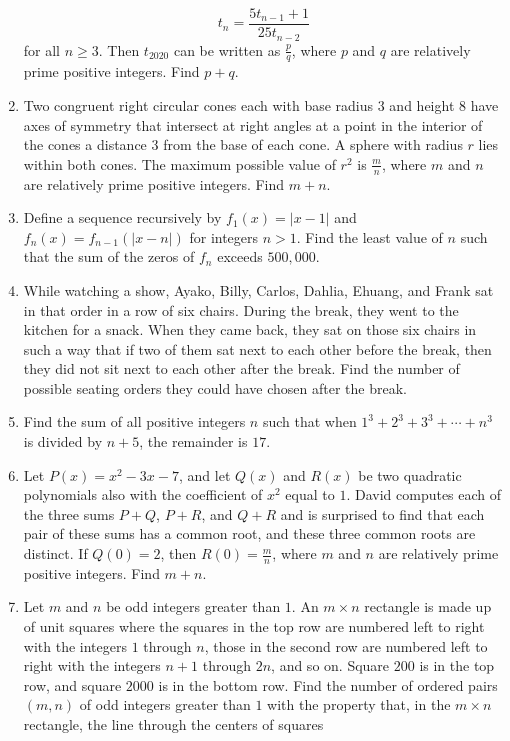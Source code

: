 \documentclass{article}
\begin{document}
\begin{enumerate}[label=\arabic*., itemsep=0.5em]
\begin{equation*}
t_n = \frac{5t_{n-1}+1}{25t_{n-2}}
\end{equation*}
for all $n \ge 3$. Then $t_{2020}$ can be written as $\frac{p}{q}$, where $p$ and $q$ are relatively prime positive integers. Find $p+q$.\par \vspace{0.5em}\item Two congruent right circular cones each with base radius $3$ and height $8$ have axes of symmetry that intersect at right angles at a point in the interior of the cones a distance $3$ from the base of each cone. A sphere with radius $r$ lies within both cones. The maximum possible value of $r^2$ is $\frac{m}{n}$, where $m$ and $n$ are relatively prime positive integers. Find $m+n$.\par \vspace{0.5em}\item Define a sequence recursively by $f_1(x)=|x-1|$ and $f_n(x)=f_{n-1}(|x-n|)$ for integers $n>1$. Find the least value of $n$ such that the sum of the zeros of $f_n$ exceeds $500,000$.\par \vspace{0.5em}\item While watching a show, Ayako, Billy, Carlos, Dahlia, Ehuang, and Frank sat in that order in a row of six chairs. During the break, they went to the kitchen for a snack. When they came back, they sat on those six chairs in such a way that if two of them sat next to each other before the break, then they did not sit next to each other after the break. Find the number of possible seating orders they could have chosen after the break.\par \vspace{0.5em}\item Find the sum of all positive integers $n$ such that when $1^3+2^3+3^3+\cdots +n^3$ is divided by $n+5$, the remainder is $17$.\par \vspace{0.5em}\item Let $P(x) = x^2 - 3x - 7$, and let $Q(x)$ and $R(x)$ be two quadratic polynomials also with the coefficient of $x^2$ equal to $1$. David computes each of the three sums $P + Q$, $P + R$, and $Q + R$ and is surprised to find that each pair of these sums has a common root, and these three common roots are distinct. If $Q(0) = 2$, then $R(0) = \frac{m}{n}$, where $m$ and $n$ are relatively prime positive integers. Find $m + n$.\par \vspace{0.5em}\item Let $m$ and $n$ be odd integers greater than $1.$ An $m\times n$ rectangle is made up of unit squares where the squares in the top row are numbered left to right with the integers $1$ through $n$, those in the second row are numbered left to right with the integers $n + 1$ through $2n$, and so on. Square $200$ is in the top row, and square $2000$ is in the bottom row. Find the number of ordered pairs $(m,n)$ of odd integers greater than $1$ with the property that, in the $m\times n$ rectangle, the line through the centers of squares 
\end{enumerate}
\end{document}
